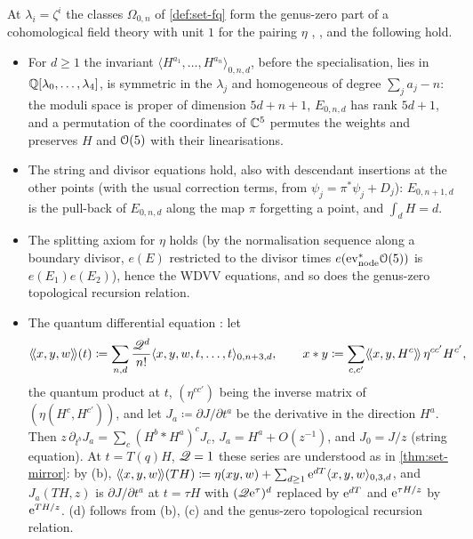 \begin{thm}
\label{thm:set-G0}
At $\lambda_i=\zeta^i$ the classes $\Omega_{0,n}$ of \cref{def:set-fq} form the genus-zero part of a cohomological field theory with unit $1$ for the pairing $\eta$ \cite[Section~4.1]{GJR18}, \cite[Def.~0.3]{PPZ15}, and the following hold.
\begin{itemize}
\item[(a)] For $d\geq1$ the invariant $\langle H^{a_1},\dots,H^{a_n}\rangle_{0,n,d}$, before the specialisation, lies in $\mathbb{Q}[\lambda_0,\dots,\lambda_4]$, is symmetric in the $\lambda_j$ and homogeneous of degree $\sum_ja_j-n$: the moduli space is proper of dimension $5d+n+1$, $E_{0,n,d}$ has rank $5d+1$, and a permutation of the coordinates of $\mathbb{C}^5$ permutes the weights and preserves $H$ and $\mathcal{O}(5)$ with their linearisations.
\item[(b)] The string and divisor equations hold, also with descendant insertions at the other points (with the usual correction terms, from $\psi_j=\pi^*\psi_j+D_j$): $E_{0,n+1,d}$ is the pull-back of $E_{0,n,d}$ along the map $\pi$ forgetting a point, and $\int_dH=d$.
\item[(c)] The splitting axiom for $\eta$ holds (by the normalisation sequence along a boundary divisor, $e(E)$ restricted to the divisor times $e(\mathrm{ev}_{\mathrm{node}}^*\mathcal{O}(5))$ is $e(E_1)e(E_2)$), hence the WDVV equations, and so does the genus-zero topological recursion relation.
\item[(d)] The quantum differential equation \cite[Section~5.2, the display before (14), of which (14) is the form in the $q$-direction]{GJR18}: let
\[
\langle\!\langle x,y,w\rangle\!\rangle(t)\coloneqq\sum_{n,d}\frac{\mathscr{Q}^d}{n!}\langle x,y,w,t,\dots,t\rangle_{0,n+3,d},\qquad x*y\coloneqq\sum_{c,c'}\langle\!\langle x,y,H^c\rangle\!\rangle\,\eta^{cc'}H^{c'},
\]
the quantum product at $t$, $(\eta^{cc'})$ being the inverse matrix of $(\eta(H^c,H^{c'}))$, and let $J_a\coloneqq\partial J/\partial t^a$ be the derivative in the direction $H^a$. Then $z\,\partial_{t^b}J_a=\sum_c(H^b*H^a)^cJ_c$, $J_a=H^a+O(z^{-1})$, and $J_0=J/z$ (string equation). At $t=T(q)H$, $\mathscr{Q}=1$ these series are understood as in \cref{thm:set-mirror}: by (b), $\langle\!\langle x,y,w\rangle\!\rangle(TH)\coloneqq\eta(xy,w)+\sum_{d\geq1}\mathrm{e}^{dT}\langle x,y,w\rangle_{0,3,d}$, and $J_a(TH,z)$ is $\partial J/\partial t^a$ at $t=\tau H$ with $(\mathscr{Q}\mathrm{e}^{\tau})^d$ replaced by $\mathrm{e}^{dT}$ and $\mathrm{e}^{\tau H/z}$ by $\mathrm{e}^{TH/z}$. (d) follows from (b), (c) and the genus-zero topological recursion relation.
\end{itemize}
\end{thm}


